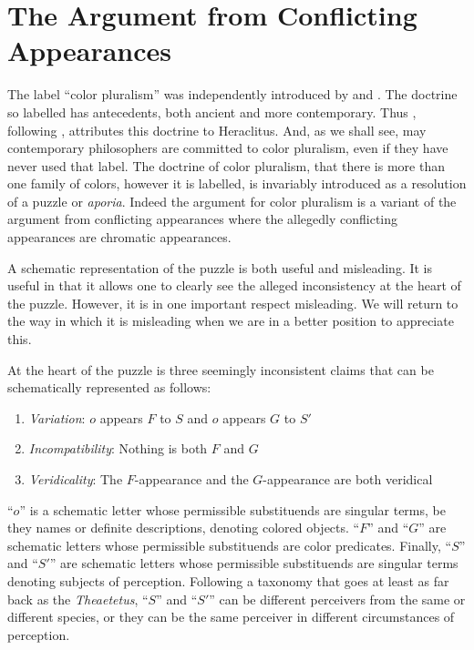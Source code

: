 \documentclass[12pt]{article}
\begin{document}
\section{The Argument from Conflicting Appearances} %
\label{sec:the_argument_from_conflicting_appearances}

The label ``color pluralism'' was independently introduced by \citet{Mizrahi:2006zr} and \citet{Kalderon:2006tg}. The doctrine so labelled has antecedents, both ancient and more contemporary. Thus \citet{Kalderon:2006tg}, following \citet{Burnyeat:1979mv}, attributes this doctrine to Heraclitus. And, as we shall see, may contemporary philosophers are committed to color pluralism, even if they have never used that label. The doctrine of color pluralism, that there is more than one family of colors, however it is labelled, is invariably introduced as a resolution of a puzzle or \emph{aporia}. Indeed the argument for color pluralism is a variant of the argument from conflicting appearances where the allegedly conflicting appearances are chromatic appearances. 

A schematic representation of the puzzle is both useful and misleading. It is useful in that it allows one to clearly see the alleged inconsistency at the heart of the puzzle. However, it is in one important respect misleading. We will return to the way in which it is misleading when we are in a better position to appreciate this.

At the heart of the puzzle is three seemingly inconsistent claims that can be schematically represented as follows:
\begin{enumerate}
	\item \emph{Variation}: \( o \) appears \( F \) to \( S \) and \( o \) appears \( G \) to \( S' \)
	\item \emph{Incompatibility}: Nothing is both \( F \) and \( G \)
	\item \emph{Veridicality}: The \( F \)-appearance and the \( G \)-appearance are both veridical
\end{enumerate}
``\( o \)'' is a schematic letter whose permissible substituends are singular terms, be they names or definite descriptions, denoting colored objects. ``\( F \)'' and ``\( G \)'' are schematic letters whose permissible substituends are color predicates. Finally, ``\( S \)'' and ``\( S' \)'' are schematic letters whose permissible substituends are singular terms denoting subjects of perception. Following a taxonomy that goes at least as far back as the \emph{Theaetetus}, ``\( S \)'' and ``\( S' \)'' can be different perceivers from the same or different species, or they can be the same perceiver in different circumstances of perception.
\end{document}
